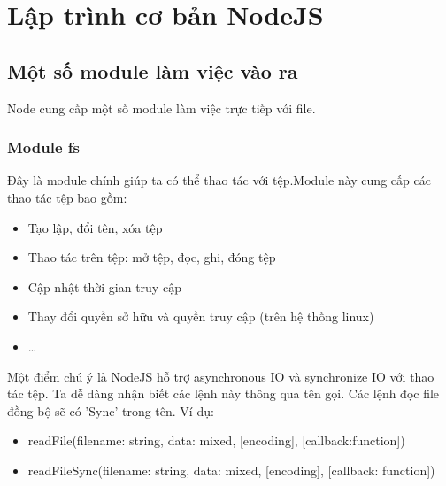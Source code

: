 \chapter{Lập trình cơ bản NodeJS}
\label{ch: Lập trình cơ bản NodeJS}

\section{Một số module làm việc vào ra}
		Node cung cấp một số module làm việc trực tiếp với file.
	\subsection{Module fs}
		Đây là module chính giúp ta có thể thao tác với tệp.Module này cung cấp các thao tác tệp bao gồm:
		\begin{itemize}
			\item Tạo lập, đổi tên, xóa tệp 
			\item Thao tác trên tệp: mở tệp, đọc, ghi, đóng tệp 
			\item Cập nhật thời gian truy cập
			\item Thay đổi quyền sở hữu và quyền truy cập (trên hệ thống linux)
			\item …
		\end{itemize}
		
		Một điểm chú ý là NodeJS hỗ trợ asynchronous IO và synchronize IO với thao tác tệp. Ta dễ dàng nhận biết các lệnh này thông qua tên gọi. Các lệnh đọc file đồng bộ sẽ có 'Sync' trong tên. Ví dụ:
		\begin{itemize}
			\item readFile(filename: string, data: mixed, [encoding], [callback:function])
			\item readFileSync(filename: string, data: mixed, [encoding], [callback: function])
		\end{itemize}
		
